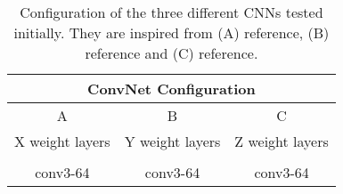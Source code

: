 \medskip
\begin{table}[htbp]
\begin{center}
\begin{tabular}{|c|c|c|}

  \hline
  \multicolumn{3}{|c|}{ConvNet Configuration} \\
  \hline

  A & B & C
  \\\hline

  X weight layers & Y weight layers & Z weight layers
  \\\hhline{|=|=|=|}

  \multicolumn{3}{|c|}{input ($64\times64\;RGB\;image$)}
  \\\hline

  conv3-64 & conv3-64 & conv3-64
  \\\hline

  \end{tabular}
\caption[]
{\small
  Configuration of the three different CNNs tested initially. They are inspired from (A) reference, (B) reference and (C) reference.
}
\label{table:3_configurations}
\end{center}
\end{table}
